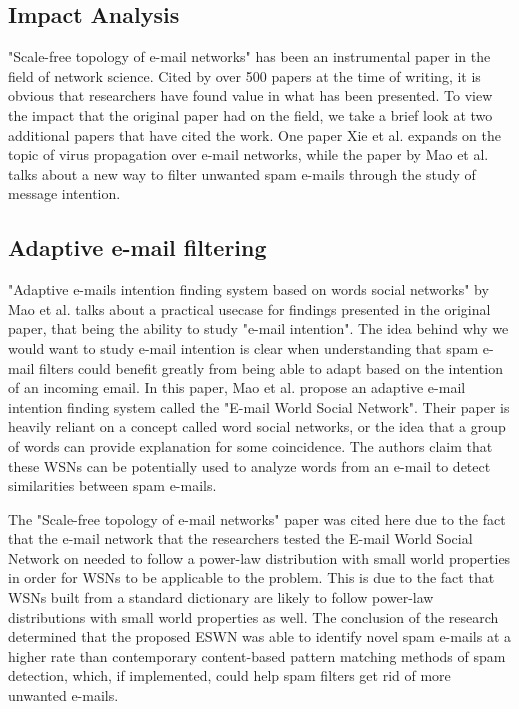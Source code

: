 \documentclass[11pt]{article}
\begin{document}
\begin{multicols}{2}
\section{Impact Analysis}
\hspace*{\parindent}"Scale-free topology of e-mail networks" has been an instrumental paper in the field of network science. Cited by over 500 papers at the time of writing, it is obvious that researchers have found value in what has been presented. To view the impact that the original paper had on the field, we take a brief look at two additional papers that have cited the work. One paper Xie et al. \cite{5} expands on the topic of virus propagation over e-mail networks, while the paper by Mao et al. \cite{4} talks about a new way to filter unwanted spam e-mails through the study of message intention.

\subsection{Adaptive e-mail filtering}
\hspace*{\parindent}"Adaptive e-mails intention finding system based on words social networks" by Mao et al. \cite{4} talks about a practical usecase for findings presented in the original paper, that being the ability to study "e-mail intention". The idea behind why we would want to study e-mail intention is clear when understanding that spam e-mail filters could benefit greatly from being able to adapt based on the intention of an incoming email. In this paper, Mao et al. propose an adaptive e-mail intention finding system called the "E-mail World Social Network". Their paper is heavily reliant on a concept called word social networks, or the idea that a group of words can provide explanation for some coincidence. The authors claim that these WSNs can be potentially used to analyze words from an e-mail to detect similarities between spam e-mails. 

The "Scale-free topology of e-mail networks" paper was cited here due to the fact that the e-mail network that the researchers tested the E-mail World Social Network on needed to follow a power-law distribution with small world properties in order for WSNs to be applicable to the problem. This is due to the fact that WSNs built from a standard dictionary are likely to follow power-law distributions with small world properties as well. The conclusion of the research determined that the proposed ESWN was able to identify novel spam e-mails at a higher rate than contemporary content-based pattern matching methods of spam detection, which, if implemented, could help spam filters get rid of more unwanted e-mails.


\end{multicols}
\end{document}
